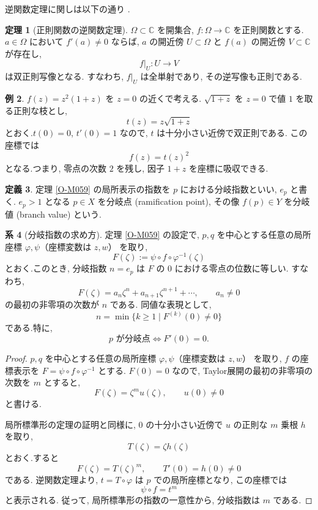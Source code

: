 \documentclass[dvipdfmx,a4paper,11pt]{article} %
\newcommand{\C}{\mathbb{C}}
\theoremstyle{definition}
\newtheorem{thm}{定理}[section]
\numberwithin{equation}{section}
\newtheorem{cor}[thm]{系}
\newtheorem{dfn}[thm]{定義}
\newtheorem{exa}[thm]{例}
\begin{document}
逆関数定理に関しは以下の通り
.\begin{thm}[正則関数の逆関数定理]\label{thm-holomorphic-inverse}
$\Omega\subset\C$ を開集合, $f:\Omega\to\C$ を正則関数とする.
$a\in\Omega$ において $f'(a)\neq0$ ならば, 
$a$ の開近傍 $U\subset\Omega$ と $f(a)$ の開近傍 $V\subset\C$ が存在し, 
\[
f|_U:U\to V
\]
は双正則写像となる.
すなわち, $f|_U$ は全単射であり, その逆写像も正則である.
\end{thm}
\begin{exa}
$f(z)=z^2(1+z)$ を $z=0$ の近くで考える.
$\sqrt{1+z}$ を $z=0$ で値 $1$ を取る正則な枝とし, 
\[
t(z)=z\sqrt{1+z}
\]
とおく.$t(0)=0$, $t'(0)=1$ なので, $t$ は十分小さい近傍で双正則である.
この座標では
\[
f(z)=t(z)^2
\]
となる.つまり, 零点の次数 $2$ を残し, 因子 $1+z$ を座標に吸収できる.
\end{exa}



\begin{dfn}\label{O-M061}
定理 \ref{O-M059} の局所表示の指数を $p$ における分岐指数といい,
$e_p$ と書く. $e_p>1$ となる $p\in X$ を分岐点
(ramification point), その像 $f(p)\in Y$ を分岐値 (branch value) という.
\end{dfn}


\begin{cor}[分岐指数の求め方]\label{cor-ramification-order}
定理 \ref{O-M059} の設定で, 
$p,q$ を中心とする任意の局所座標 $\varphi,\psi$（座標変数は $z,w$） を取り, 
\[
F(\zeta):=\psi\circ f\circ \varphi^{-1}(\zeta)
\]
とおく.このとき, 分岐指数 $n=e_p$ は
$F$ の $0$ における零点の位数に等しい.
すなわち, 
\[
F(\zeta)=a_n\zeta^n+a_{n+1}\zeta^{n+1}+\cdots,
\qquad a_n\neq0
\]
の最初の非零項の次数が $n$ である.
同値な表現として, 
\[
n=\min\{k\geq1\mid F^{(k)}(0)\neq0\}
\]
である.特に, 
\[
p\text{ が分岐点}\iff F'(0)=0.
\]
\end{cor}
\begin{proof}
$p,q$ を中心とする任意の局所座標 $\varphi,\psi$（座標変数は $z,w$） を取り, 
$f$ の座標表示を $F=\psi\circ f\circ \varphi^{-1}$ とする.
$F(0)=0$ なので, Taylor展開の最初の非零項の次数を $m$ とすると, 
\[
F(\zeta)=\zeta^m u(\zeta),\qquad u(0)\neq0
\]
と書ける.

局所標準形の定理の証明と同様に, 
$0$ の十分小さい近傍で $u$ の正則な $m$ 乗根 $h$ を取り, 
\[
T(\zeta)=\zeta h(\zeta)
\]
とおく.すると
\[
F(\zeta)=T(\zeta)^m,\qquad T'(0)=h(0)\neq0
\]
である.
逆関数定理より, $t=T\circ\varphi$ は $p$ での局所座標となり, 
この座標では
\[
\psi\circ f=t^m
\]
と表示される.
従って, 局所標準形の指数の一意性から, 分岐指数は $m$ である.
\end{proof}
\end{document}
